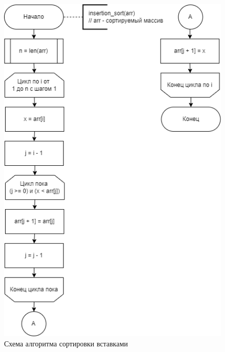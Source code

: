 \begin{figure}[h!btp]
	\centering
	\includegraphics[width=340pt]{inc/sorting-insertion.png}
	\caption{Схема алгоритма сортировки вставками}
	\label{fig:sorting-insertion}	
\end{figure}
\clearpage

